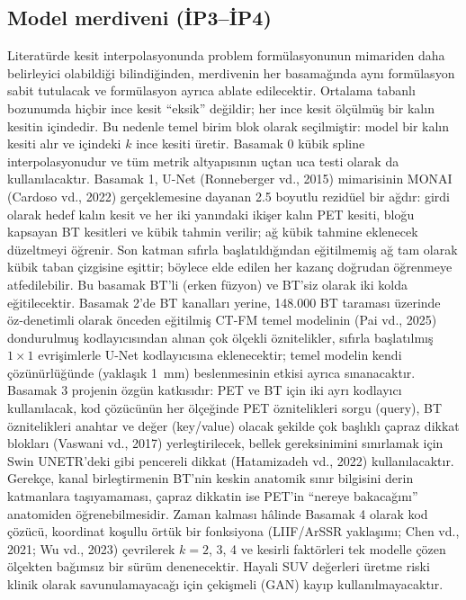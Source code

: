 \documentclass[11pt,a4paper]{article}
\begin{document}
\subsection{Model merdiveni (İP3--İP4)}
Literatürde kesit interpolasyonunda problem formülasyonunun mimariden daha belirleyici
olabildiği bilindiğinden, merdivenin her basamağında aynı formülasyon sabit tutulacak ve
formülasyon ayrıca ablate edilecektir. Ortalama tabanlı bozunumda hiçbir ince kesit ``eksik''
değildir; her ince kesit ölçülmüş bir kalın kesitin içindedir. Bu nedenle temel birim blok
olarak seçilmiştir: model bir kalın kesiti alır ve içindeki $k$ ince kesiti üretir. Basamak 0
kübik spline interpolasyonudur ve tüm metrik altyapısının uçtan uca testi olarak da
kullanılacaktır. Basamak 1, U-Net (Ronneberger vd., 2015) mimarisinin MONAI (Cardoso vd., 2022)
gerçeklemesine dayanan 2.5 boyutlu rezidüel bir ağdır: girdi olarak hedef kalın kesit ve her iki
yanındaki ikişer kalın PET kesiti, bloğu kapsayan BT kesitleri ve kübik tahmin verilir; ağ kübik
tahmine eklenecek düzeltmeyi öğrenir. Son katman sıfırla başlatıldığından eğitilmemiş ağ tam
olarak kübik taban çizgisine eşittir; böylece elde edilen her kazanç doğrudan öğrenmeye
atfedilebilir. Bu basamak BT'li (erken füzyon) ve BT'siz olarak iki kolda eğitilecektir.
Basamak 2'de BT kanalları yerine, 148.000 BT taraması üzerinde öz-denetimli olarak önceden
eğitilmiş CT-FM temel modelinin (Pai vd., 2025) dondurulmuş kodlayıcısından alınan çok ölçekli
öznitelikler, sıfırla başlatılmış $1 \times 1$ evrişimlerle U-Net kodlayıcısına eklenecektir;
temel modelin kendi çözünürlüğünde (yaklaşık 1~mm) beslenmesinin etkisi ayrıca sınanacaktır.
Basamak 3 projenin özgün katkısıdır: PET ve BT için iki ayrı kodlayıcı kullanılacak, kod
çözücünün her ölçeğinde PET öznitelikleri sorgu (query), BT öznitelikleri anahtar ve değer
(key/value) olacak şekilde çok başlıklı çapraz dikkat blokları (Vaswani vd., 2017)
yerleştirilecek, bellek gereksinimini sınırlamak için Swin UNETR'deki gibi pencereli dikkat
(Hatamizadeh vd., 2022) kullanılacaktır. Gerekçe, kanal birleştirmenin BT'nin keskin anatomik
sınır bilgisini derin katmanlara taşıyamaması, çapraz dikkatin ise PET'in ``nereye bakacağını''
anatomiden öğrenebilmesidir. Zaman kalması hâlinde Basamak 4 olarak kod çözücü, koordinat
koşullu örtük bir fonksiyona (LIIF/ArSSR yaklaşımı; Chen vd., 2021; Wu vd., 2023) çevrilerek
$k = 2$, 3, 4 ve kesirli faktörleri tek modelle çözen ölçekten bağımsız bir sürüm denenecektir.
Hayali SUV değerleri üretme riski klinik olarak savunulamayacağı için çekişmeli (GAN) kayıp
kullanılmayacaktır.
\end{document}
